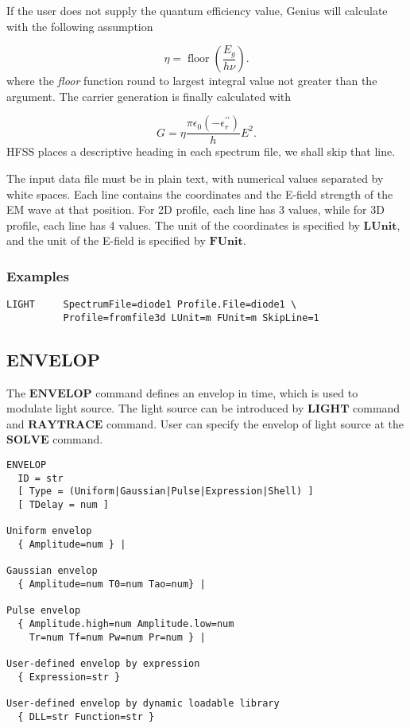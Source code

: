 \documentclass[oneside,12pt]{cgd_book}
\begin{document}
\par
If the user does not supply the quantum efficiency value, Genius will calculate with the following
          assumption
\par
\begin{equation}
\eta = \mathop{floor}\nolimits ( \frac{E_g}{h \nu} ).
\end{equation}
where the \emph{floor} function round to largest integral value not
          greater than the argument. The carrier generation is finally calculated with
\par
\begin{equation}
G = \eta \frac{\pi \epsilon_0 \left(-\epsilon^{\prime\prime}_{r}\right)} {h} E^2.
\end{equation}
HFSS places a descriptive heading in each spectrum file, we shall skip that line.
\par
{}The input data file must be in plain text, with numerical values separated by white spaces. Each line
            contains the coordinates and the E-field strength of the EM wave at that position. For 2D profile, each line
            has 3 values, while for 3D profile, each line has 4 values. The unit of the coordinates is specified by
$\mathbf{LUnit}$, and the unit of the E-field is specified by $\mathbf{FUnit}$.
\par
\par
\subsubsection{Examples}
\begin{lstlisting}[style=GeniusCode]
LIGHT     SpectrumFile=diode1 Profile.File=diode1 \
          Profile=fromfile3d LUnit=m FUnit=m SkipLine=1
\end{lstlisting}
\subsection{ENVELOP}
The $\mathbf{ENVELOP}$
command defines an envelop in time, which is used to modulate light
        source. The light source can be introduced by $\mathbf{LIGHT}$
command and $\mathbf{RAYTRACE}$ command. User can specify the envelop of light source at the
$\mathbf{SOLVE}$ command.
\par
\begin{lstlisting}[style=GeniusCmd]
ENVELOP
  ID = str
  [ Type = (Uniform|Gaussian|Pulse|Expression|Shell) ]
  [ TDelay = num ]

Uniform envelop
  { Amplitude=num } |

Gaussian envelop
  { Amplitude=num T0=num Tao=num} |

Pulse envelop
  { Amplitude.high=num Amplitude.low=num
    Tr=num Tf=num Pw=num Pr=num } |

User-defined envelop by expression
  { Expression=str }

User-defined envelop by dynamic loadable library
  { DLL=str Function=str }
\end{lstlisting}
\par
\end{document}
